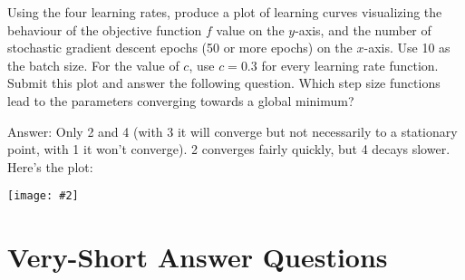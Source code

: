 \documentclass{article}
\def\ans#1{\par\gre{Answer: #1}}
\def\blu#1{{\color{blu}#1}}
\def\gre#1{{\color{gre}#1}}
\newcommand{\centerfig}[2]{\begin{center}\texttt{[image: \#2]}\end{center}}
\begin{document}
Using the four learning rates, produce a plot of learning curves visualizing the behaviour of the objective function $f$ value on the $y$-axis, and the number of stochastic gradient descent epochs (50 or more epochs) on the $x$-axis. Use 10 as the batch size. For the value of $c$, use $c = 0.3$ for every learning rate function. \blu{Submit this plot and answer the following question. Which step size functions lead to the parameters converging towards a global minimum?}

\ans{Only 2 and 4 (with 3 it will converge but not necessarily to a stationary point, with 1 it won't converge). 2 converges fairly quickly, but 4 decays slower. Here's the plot:
\centerfig{.7}{"../figs/sgd_learning_curves.png"}
}

\section{Very-Short Answer Questions}
\end{document}
